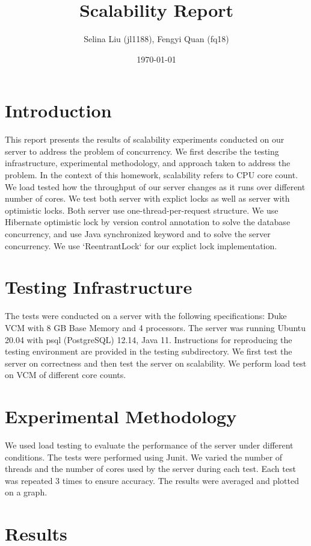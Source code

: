 \documentclass{article}
\begin{document}
\title{Scalability Report}
\author{Selina Liu (jl1188), Fengyi Quan (fq18)}
\date{\today}
\maketitle

\section{Introduction}
This report presents the results of scalability experiments conducted on our server to address the problem of concurrency. We first describe the testing infrastructure, experimental methodology, and approach taken to address the problem. In the context of this homework, scalability refers to CPU core count. We load tested how the throughput of our server changes as it runs over different number of cores. We test both server with explict locks as well as server with optimistic locks. Both server use one-thread-per-request structure. We use Hibernate optimistic lock by version control annotation to solve the database concurrency, and use Java synchronized keyword and to solve the server concurrency. We use `ReentrantLock` for our explict lock implementation.

\section{Testing Infrastructure}
The tests were conducted on a server with the following specifications: Duke VCM with 8 GB Base Memory and 4 processors. The server was running Ubuntu 20.04 with psql (PostgreSQL) 12.14, Java 11. Instructions for reproducing the testing environment are provided in the testing subdirectory. We first test the server on correctness and then test the server on scalability. We perform load test on VCM of different core counts. 

\section{Experimental Methodology}
We used load testing to evaluate the performance of the server under different conditions. The tests were performed using Junit. We varied the number of threads and the number of cores used by the server during each test. Each test was repeated 3 times to ensure accuracy. The results were averaged and plotted on a graph.
\section{Results}
\end{document}
